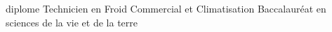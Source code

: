 %
%
%


\begin{scholarship}

					{diplome Technicien en Froid Commercial et Climatisation}
					{Baccalauréat en sciences de la vie et de la terre}
\end{scholarship}
